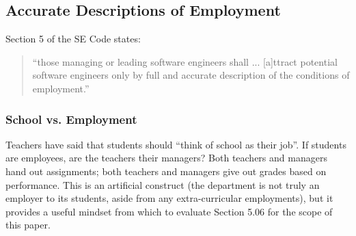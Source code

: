 \documentclass[11pt]{article}
\begin{document}
\begin{multicols}{2}
%
%
%
%
%
%

\subsection{Accurate Descriptions of Employment}

Section 5 of the SE Code states:

\begin{quote}
``those managing or leading software engineers shall ... [a]ttract potential software engineers only by full and accurate description of the conditions of employment.'' \cite{secode}
\end{quote}

\subsubsection{School vs. Employment}

Teachers have said that students should ``think of school as their job''. \cite{schoolJob}  If students are employees, are the teachers their managers?  Both teachers and managers hand out assignments; both teachers and managers give out grades based on performance. \cite{performanceReview}  This is an artificial construct (the department is not truly an employer to its students, aside from any extra-curricular employments), but it provides a useful mindset from which to evaluate Section 5.06 for the scope of this paper.


\end{multicols}
\end{document}
